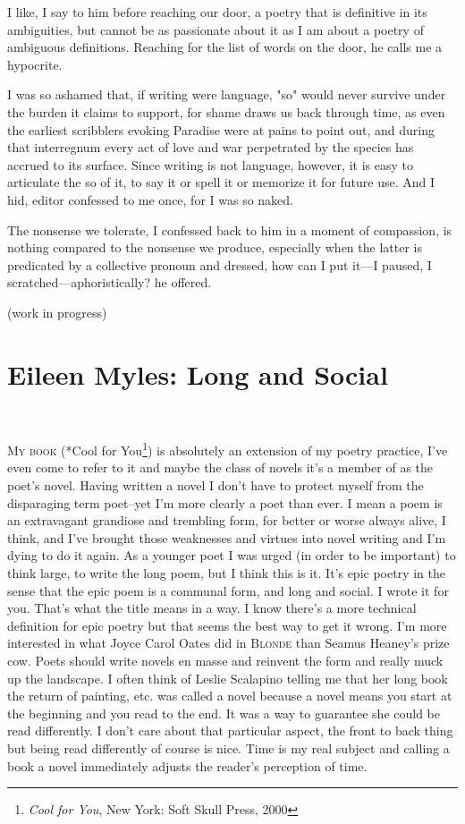 \documentclass[
]{memoir}
\begin{document}
I like, I say to him before reaching our door, a poetry that is
definitive in its ambiguities, but cannot be as passionate about it as I
am about a poetry of ambiguous definitions. Reaching for the list of
words on the door, he calls me a hypocrite.

I was so ashamed that, if writing were language, "so" would never
survive under the burden it claims to support, for shame draws us back
through time, as even the earliest scribblers evoking Paradise were at
pains to point out, and during that interregnum every act of love and
war perpetrated by the species has accrued to its surface. Since writing
is not language, however, it is easy to articulate the so of it, to say
it or spell it or memorize it for future use. And I hid, editor
confessed to me once, for I was so naked.

The nonsense we tolerate, I confessed back to him in a moment of
compassion, is nothing compared to the nonsense we produce, especially
when the latter is predicated by a collective pronoun and dressed, how
can I put it---I paused, I scratched---aphoristically? he offered.

(work in progress)

\hypertarget{eileen-myles-long-and-social}{%
\chapter{Eileen Myles: Long and
Social}\label{eileen-myles-long-and-social}}

~

\lettrine[lines=3, findent=0em, nindent=0.1em, lhang=0]{M}{y book}
(*Cool for You\footnote{\emph{Cool for You}, New York: Soft Skull Press,
  2000}) is absolutely an extension of my poetry practice, I've even
come to refer to it and maybe the class of novels it's a member of as
the poet's novel. Having written a novel I don't have to protect myself
from the disparaging term poet--yet I'm more clearly a poet than ever. I
mean a poem is an extravagant grandiose and trembling form, for better
or worse always alive, I think, and I've brought those weaknesses and
virtues into novel writing and I'm dying to do it again. As a younger
poet I was urged (in order to be important) to think large, to write the
long poem, but I think this is it. It's epic poetry in the sense that
the epic poem is a communal form, and long and social. I wrote it for
you. That's what the title means in a way. I know there's a more
technical definition for epic poetry but that seems the best way to get
it wrong. I'm more interested in what Joyce Carol Oates did in
\textsc{Blonde} than Seamus Heaney's prize cow. Poets should write
novels en masse and reinvent the form and really muck up the landscape.
I often think of Leslie Scalapino telling me that her long book the
return of painting, etc. was called a novel because a novel means you
start at the beginning and you read to the end. It was a way to
guarantee she could be read differently. I don't care about that
particular aspect, the front to back thing but being read differently of
course is nice. Time is my real subject and calling a book a novel
immediately adjusts the reader's perception of time.
\end{document}
